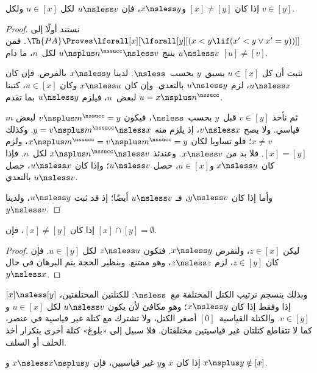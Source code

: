 \documentclass[../../../include/open-logic-section]{subfiles}
\begin{document}
\begin{prop}
إذا كان $[x] \neq [y]$ و$x \nsless y$، فإن $u \nsless v$ لكل
$u \in [x]$ ولكل $v \in [y]$.
\end{prop}

\begin{proof}
نستند أولًا إلى
$\Th{PA} \Proves \lforall[x][\lforall[y][(x < y \lif (x' < y
    \lor x' = y))]]$. فمن $u \nsless v$ ينتج
$u \nsplus n^\nssucc \nsless v$ لكل~$n$، ما دام $[u] \neq [v]$.

نثبت أن كل $u \in [x]$ يسبق~$y$ بحسب~$\nsless$.
لدينا $x \nsless y$ بالفرض. فإن كان $u \nsless x$،
لزم $u \nsless y$ بالتعدي. وإن كان $x \nsless u$
وكان $u \in [x]$، كتبنا $u = x\nsplus n^\nssucc$
لبعض~$n$، فيلزم $u \nsless y$ بما تقدم.

ثم نأخذ $v \in [y]$ قبل~$y$ بحسب~$\nsless$، فيكون
$v \nsplus m^\nssucc = y$ لبعض $m$ قياسي.
ولا يصح $v \nsless x$، إذ يلزم منه
$y = v \nsplus m^\nssucc \nsless x$. وكذلك $x \neq v$؛
فلو تساويا لكان $x \nsplus m^\nssucc = v \nsplus m^\nssucc = y$،
ولزم $[x] = [y]$. فلا بد من $x \nsless v$.
وعندئذ $x \nsplus n^\nssucc \nsless v$ لكل~$n$.
فإذا كان $x \nsless u$ و$u \in [x]$، حصل $u \nsless v$؛
وإذا كان $u \nsless x$، حصل $u \nsless v$ بالتعدي.

وأما إذا كان $y \nsless v$، فـ $u \nsless v$ أيضًا؛
إذ قد ثبت $u \nsless y$، ولدينا $y \nsless v$.
\end{proof}

\begin{cor}
إذا كان $[x] \neq [y]$، فإن $[x] \cap [y] = \emptyset$.
\end{cor}

\begin{proof}
ليكن $z \in [x]$، ولنفرض $x \nsless y$. فتكون
$z \nsless u$ لكل $u \in [y]$. فإن كان $z \in [y]$،
لزم $z \nsless z$، وهو ممتنع. وبنظير الحجة يتم
البرهان في حال $y \nsless x$.
\end{proof}

\begin{explain}
وبذلك ينسجم ترتيب الكتل المختلفة مع~$\nsless$:
للكتلتين المختلفتين، $[x] \nsless [y]$ إذا وفقط إذا
كان $x \nsless y$؛ وهو مكافئ لأن يكون $u \nsless v$
لكل $u \in [x]$ و$v \in [y]$. والكتلة القياسية~$[0]$
أصغر الكتل، ولا تشترك مع كتلة غير قياسية في عنصر،
كما لا تتقاطع كتلتان غير قياسيتين مختلفتان.
فلا سبيل إلى «بلوغ» كتلة أخرى بتكرار أخذ الخلف أو السلف.
\end{explain}

\begin{prop}
إذا كان $x$ و$y$ غير قياسيين، فإن $x \nsless x \nsplus y$ و
$x \nsplus y \notin [x]$.
\end{prop}
\end{document}
